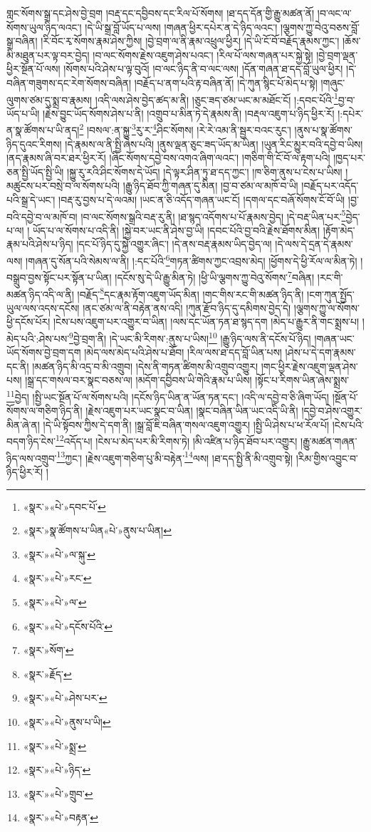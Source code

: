གླང་སོགས་སྒྲ་དང་ཤེས་བྱེ་བྲག །བརྡ་དང་དབྱིབས་དང་རིལ་པོ་སོགས། །ཐ་དད་དོན་གྱི་རྒྱུ་མཚན་ནོ། །བ་ལང་ལ་སོགས་ཡུལ་ཉིད་ལའང་། །དེ་ཡི་སྒྲ་བློ་ཡོད་པ་ལས། །གཞན་ཕྱིར་དཔེར་ན་དེ་ཉིད་ལའང་། །ལྕགས་ཀྱུ་བེའུ་བཅས་བློ་སྒྲ་བཞིན། །རི་བོང་རྭ་སོགས་རྣམ་ཤེས་ཀྱིས། །བྱེ་བྲག་ལ་ནི་རྣམ་འཕྲུལ་ཕྱིར། །དེ་ཡི་ངོ་བོ་བརྗོད་རྣམས་ཀྱང་། །ཆོས་མི་མཐུན་པར་ལྟ་བར་བྱེད། །བ་ལང་སོགས་རྗེས་འཇུག་ཤེས་པའང་། །རིལ་པོ་ལས་གཞན་པར་སྐྱེ་སྟེ། །བྱེ་བྲག་ལྡན་ཕྱིར་སྔོན་པོ་ལས། །སོགས་པའི་ཤེས་པ་ལྟ་བུའོ། །བ་ལང་ཉིད་ནི་བ་ལང་ལས། །དོན་གཞན་ཐ་དད་བློ་ཡུལ་ཕྱིར། །དེ་བཞིན་གཟུགས་དང་རེག་སོགས་བཞིན། །བརྗོད་པ་ནག་པའི་རྟ་བཞིན་ནོ། །དེ་ཀུན་སྙིང་པོ་མེད་པ་སྟེ། །གཞུང་ལུགས་ཙམ་དུ་སྨྲ་བ་རྣམས། །འདི་ལས་ཤེས་བྱེད་ཚད་མ་ནི། །ཅུང་ཟད་ཙམ་ཡང་མ་མཐོང་ངོ། །:དབང་པོའི་\footnote{«སྣར་»«པེ་»དབང་པོ་}བྱ་བ་ཡོད་པ་ཡི། །རྗེས་བྱུང་ཡོད་སོགས་ཤེས་པ་ནི། །འགྲུབ་པ་མིན་ཏེ་དེ་རྣམས་ནི། །བརྡལ་འཇུག་པ་ཉིད་ཕྱིར་རོ། །:དཔེར་ན་སྣ་ཚོགས་པ་ཡི་ནད།\footnote{«སྣར་»སྣ་ཚོགས་པ་ཡིན«པེ་»ནུས་པ་ཡིན།} །བསལ་:ན་སྐྱུ་\footnote{«སྣར་»«པེ་»ལ་སྐུ་}རུ་ར་\footnote{«སྣར་»«པེ་»རང་}ཤིང་སོགས། །རེ་རེ་འམ་ནི་སྦྱར་བའང་རུང་། །ནུས་པ་སྣ་ཚོགས་ཉིད་དུའང་རིགས། །དེ་རྣམས་ལ་ནི་སྤྱི་ཞེས་པའི། །ནུས་ལྡན་ཅུང་ཟད་ཡོད་མ་ཡིན། །ཡུན་རིང་མྱུར་བའི་དབྱེ་བ་ཡིས། །ནད་རྣམས་ཞི་བར་ཐར་ཕྱིར་རོ། །ཞིང་སོགས་དབྱེ་བས་འགའ་ཞིག་ལའང་། །གཅིག་གི་ངོ་བོ་ལ་རྟག་པའི། །ཁྱད་པར་ཅན་སྤྱི་ཡོད་སྤྱི་ཡི། །སྐྱུ་རུ་རའི་ཤིང་སོགས་དེ་ཡོད། །དེ་ལྟར་ཤིན་ཏུ་ཐ་དད་ཀྱང་། །ཁ་ཅིག་ནུས་པ་ངེས་པ་ཡིས། །མཚུངས་པར་བསྲེ་བ་ལ་སོགས་པའི། །རྒྱུ་ཉིད་ཐོབ་ཀྱི་གཞན་དུ་མིན། །བྱ་བ་ཙམ་ལ་མཁོ་བ་ཡི། །བརྗོད་པར་འདོད་པའི་སྒྲ་དེ་ཡང་། །བརྡ་རུ་བྱས་པ་དེ་ལའམ། །ཡང་ན་ཅི་འདོད་གཞན་ཡང་ངོ། །དགལ་དང་བཞོ་སོགས་ངོ་བོ་ཡི། །བྱ་བའི་དབྱེ་བ་ལ་མཁོ་བ། །བ་ལང་སོགས་སྒྲའི་བརྡ་རུ་ནི། །ཐ་སྙད་འདོགས་པ་པོ་རྣམས་བྱེད། །དེ་བརྡ་ཡིན་པར་\footnote{«སྣར་»«པེ་»ལ་}བྱེད་པ་ལ། །
ཡོད་པ་ལ་སོགས་པ་འདི་ནི། །སྐྱེ་བར་ཡང་ནི་ཤེས་བྱ་ཡི། །དབང་པོའི་བྱ་བའི་རྗེས་ཐོགས་མིན། །རྟོག་མེད་རྣམ་པའི་ཤེས་པ་ཉིད། །དང་པོ་ཉིད་དུ་སྐྱེ་འགྱུར་ཞིང་། །དེ་ནས་བརྡ་རྣམས་ཡིད་བྱེད་ལ། །དེ་ལས་དེ་དྲན་དེ་རྣམས་ལས། །གཞན་དུ་སོན་པའི་སེམས་ལ་ནི། །:དང་པོའི་\footnote{«སྣར་»«པེ་»དངོས་པོའི་}གཏན་ཚིགས་ཀྱང་འབྲས་མེད། །ཕྱོགས་དེ་ཕྱི་རོལ་ལ་མིན་ཏེ། །བསྒྲུབ་བྱས་སྟོང་པར་སྟོན་པ་ཡིན། །དངོས་སུ་དེ་ཡི་རྒྱུ་མིན་ཏེ། །ཕྱི་ཡི་ལྕགས་ཀྱུ་བེའུ་སོགས་\footnote{«སྣར་»སོག་}བཞིན། །རང་གི་མཚན་ཉིད་འདི་ལ་ནི། །བརྗོད་\footnote{«སྣར་»རྗོད་}དང་རྣམ་རྟོག་འཇུག་ཡོད་མིན། །གང་གིས་རང་གི་མཚན་ཉིད་ནི། །ངག་ཀུན་སྤྱོད་ཡུལ་ལས་འདས་དངོས། །ནང་ཙམ་ལ་ནི་བརྟེན་ནས་འདི། །ཀུན་རྫོབ་ཉིད་དུ་དམིགས་བྱེད་དེ། །ལྕགས་ཀྱུ་ལ་སོགས་ཕྱི་དངོས་པོར། །ངེས་པས་འཇུག་པར་འགྱུར་བ་ཡིན། །ལས་དང་ཡོན་ཏན་ཐ་སྙད་དག །མེད་པ་རྒྱུར་ནི་གང་སྨྲས་པ། །མེད་པའི་:ཤེས་པས་\footnote{«སྣར་»«པེ་»ཤེས་པར་}བྱེ་བྲག་ནི། །དེ་ཡང་མི་རིགས་:ནུས་པ་ཡིས།\footnote{«སྣར་»«པེ་»ནུས་པ་ཡི།} །རྒྱུ་ཉིད་ལས་ནི་དངོས་པོ་ཉིད། །གཞན་ཡང་ཡོད་སོགས་བྱེ་བྲག་དག །མེད་ལས་མེད་པའི་ཤེས་པ་ཐོབ། །རིལ་ལས་ཐ་དད་བློ་ཡིན་པས། །ཤེས་པ་དེ་དག་རྣམས་དང་ནི། །མཚན་ཉིད་མི་འདྲ་བ་མི་འགྲུབ། །དེས་ནི་གཏན་ཚིགས་མི་འགྲུབ་འགྱུར། །གང་ཕྱིར་རྗེས་འཇུག་ལྡན་ཤེས་པས། །སྒྲ་དང་གསལ་བར་སྣང་བཅས་ལ། །མདོག་དབྱིབས་ཡི་གེའི་རྣམ་པ་ཡིས། །སྟོང་པ་རིགས་ཡིན་ཞེས་སྨྲས་\footnote{«སྣར་»«པེ་»སྨྲ་}བྱེད། །སྤྱི་ཡང་སྔོན་པོ་ལ་སོགས་པའི། །དངོས་ཉིད་ཡིན་ན་ཡོན་ཏན་དང་། །འདི་ལ་དབྱེ་བ་ཅི་ཞིག་ཡོད། །སྔོན་པོ་སོགས་ལ་གཅིག་ཉིད་ནི། །རྗེས་འཇུག་པར་ཡང་སྣང་བ་ཡིན། །སྣང་བཞིན་ཡིན་ཡང་འདི་ཡི་ནི། །དབྱེ་བ་ཤེས་འགྱུར་མིན་ཞེ་ན། །དེ་ཡི་སྟོབས་ཀྱིས་དེ་དག་ནི། །སྒྲ་བློ་ཇི་བཞིན་གསལ་འཇུག་འགྱུར། །སྤྱི་ཡི་ཤེས་པ་ཕ་རོལ་པོ། །ངེས་པའི་བདག་ཉིད་ངེས་\footnote{«སྣར་»«པེ་»ཉིད་}འདོད་པ། །ངེས་པ་མེད་པར་མི་རིགས་ཏེ། །མི་འཛིན་པ་ཉིད་ཐོབ་པར་འགྱུར། །རྒྱུ་མཚན་གཞན་ཉིད་ལས་འགྲུབ་\footnote{«སྣར་»«པེ་»གྲུབ་}ཀྱང་། །རྗེས་འཇུག་གཅིག་པུ་མི་བརྟེན་\footnote{«སྣར་»«པེ་»བརྟན་}ལས། །ཐ་དད་སྤྱི་ནི་མི་འགྲུབ་སྟེ། །རིམ་གྱིས་འབྱུང་བ་ཉིད་ཕྱིར་རོ། །
